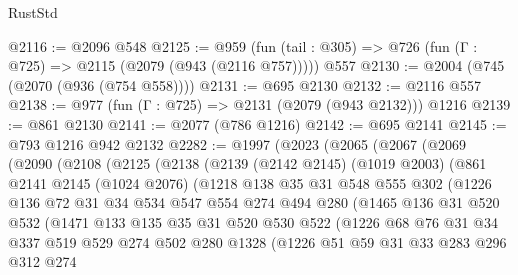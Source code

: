\begin{lexlean}{RustStd}
\begin{coremodule}
@2116 := @2096 @548
@2125 := @959 (fun (tail : @305) => @726 (fun (Γ : @725) => @2115 (@2079 (@943 (@2116 @757))))) @557
@2130 := @2004 (@745 (@2070 (@936 (@754 @558))))
@2131 := @695 @2130
@2132 := @2116 @557
@2138 := @977 (fun (Γ : @725) => @2131 (@2079 (@943 @2132))) @1216
@2139 := @861 @2130
@2141 := @2077 (@786 @1216)
@2142 := @695 @2141
@2145 := @793 @1216 @942 @2132
@2282 := @1997
    (@2023
      (@2065
        (@2067
          (@2069
            (@2090
              (@2108
                (@2125
                  (@2138
                    (@2139
                      (@2142 @2145)
                      (@1019 @2003)
                      (@861
                        @2141
                        @2145
                        (@1024 @2076)
                        (@1218
                          @138
                          @35
                          @31
                          @548
                          @555
                          @302
                          (@1226
                            @136
                            @72
                            @31
                            @34
                            @534
                            @547
                            @554
                            @274
                            @494
                            @280
                            (@1465
                              @136
                              @31
                              @520
                              @532
                              (@1471
                                @133
                                @135
                                @35
                                @31
                                @520
                                @530
                                @522
                                (@1226
                                  @68
                                  @76
                                  @31
                                  @34
                                  @337
                                  @519
                                  @529
                                  @274
                                  @502
                                  @280
                                  @1328
                                  (@1226
                                    @51
                                    @59
                                    @31
                                    @33
                                    @283
                                    @296
                                    @312
                                    @274

\end{coremodule}
\end{lexlean}

